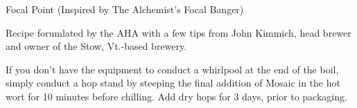 \begin{recipe}{Focal Point (Inspired by The Alchemist's Focal Banger)}

\begin{aboutblock}
Recipe forumlated by the AHA with a few tips from John Kimmich, head brewer
and owner of the Stow, Vt.-based brewery. \sourceaha
\end{aboutblock}


\begin{methodandtiming}

\begin{mashsteps}
\end{mashsteps}

\begin{directions}
If you don't have the equipment to conduct a whirlpool at the end of the boil, 
simply conduct a hop stand by steeping the final addition of Mosaic in the hot
wort for 10 minutes before chilling. Add dry hops for 3 days, prior to packaging. 
\end{directions}

\end{methodandtiming}

\recipebreak

\begin{ingredientsblock}

\begin{malts}
\end{malts}

\begin{hops}
\end{hops}


\end{ingredientsblock}

\end{recipe}

